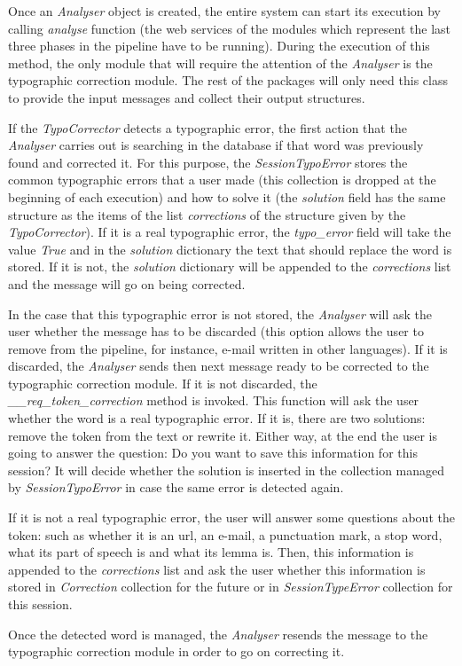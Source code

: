 Once an \textit{Analyser} object is created, the entire system can start its execution by calling \textit{analyse} function (the web services of the modules which represent the last three phases in the pipeline have to be running). During the execution of this method, the only module that will require the attention of the \textit{Analyser} is the typographic correction module. The rest of the packages will only need this class to provide the input messages and collect their output structures.

If the \textit{TypoCorrector} detects a typographic error, the first action that the \textit{Analyser} carries out is searching in the database if that word was previously found and corrected it. For this purpose, the \textit{SessionTypoError} stores the common typographic errors that a user made (this collection is dropped at the beginning of each execution) and how to solve it (the \textit{solution} field has the same structure as the items of the list \textit{corrections} of the structure given by the \textit{TypoCorrector}). If it is a real typographic error, the \textit{typo\_error} field will take the value \textit{True} and in the \textit{solution} dictionary the text that should replace the word is stored. If it is not, the \textit{solution} dictionary will be appended to the \textit{corrections} list and the message will go on being corrected.

In the case that this typographic error is not stored, the \textit{Analyser} will ask the user whether the message has to be discarded (this option allows the user to remove from the pipeline, for instance, e-mail written in other languages). If it is discarded, the \textit{Analyser} sends then next message ready to be corrected to the typographic correction module. If it is not discarded, the \textit{\_\_req\_token\_correction} method is invoked. This function will ask the user whether the word is a real typographic error. If it is, there are two solutions: remove the token from the text or rewrite it. Either way, at the end the user is going to answer the question: Do you want to save this information for this session? It will decide whether the solution is inserted in the collection managed by \textit{SessionTypoError} in case the same error is detected again.

If it is not a real typographic error, the user will answer some questions about the token: such as whether it is an url, an e-mail, a punctuation mark, a stop word, what its part of speech is and what its lemma is. Then, this information is appended to the \textit{corrections} list and ask the user whether this information is stored in \textit{Correction} collection for the future or in \textit{SessionTypeError} collection for this session.

Once the detected word is managed, the \textit{Analyser} resends the message to the typographic correction module in order to go on correcting it.

